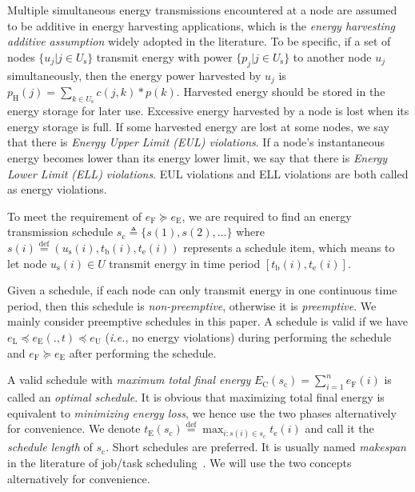 \documentclass[journal,10pt]{IEEEtran}
\begin{document}
Multiple simultaneous energy transmissions encountered at a node are assumed to be additive in energy harvesting applications, which is the \textit{energy harvesting additive assumption} widely adopted in the literature\cite{He2013,Dai2017TON,Dai2018TON}. To be specific, if a set of nodes $\{u_j|j{\in}U_\text{s}\}$ transmit energy with power $\{p_j|j{\in}U_\text{s}\}$ to another node $u_j$ simultaneously, then the energy power harvested by $u_j$ is $p_\text{H}(j){=}\sum_{k{\in}U_\text{s}}c(j,k){*}p(k)$. Harvested energy should be stored in the energy storage for later use. Excessive energy harvested by a node is lost when its energy storage is full. If some harvested energy are lost at some nodes, we say that there is \textit{Energy Upper Limit (EUL) violations}. If a node's instantaneous energy becomes lower than its energy lower limit, we say that there is \textit{Energy Lower Limit (ELL) violations}. EUL violations and ELL violations are both called as energy violations.

To meet the requirement of $e_\text{F}{\succeq}e_\text{E}$, we are required to find an energy transmission schedule $s_\text{c}{\triangleq}\{s(1),s(2),\ldots\}$ where $s(i){\mathop{=}\limits^\text{def}}(u_\text{s}(i), t_\text{b}(i),t_\text{e}(i))$ represents a schedule item, which means to let node $u_\text{s}(i){\in}U$ transmit energy in time period $[t_\text{b}(i),t_\text{e}(i)]$.

Given a schedule, if each node can only transmit energy in one continuous time period, then this schedule is \textit{non-preemptive}, otherwise it is \textit{preemptive}. We mainly consider preemptive schedules in this paper. A schedule is valid if we have $e_\text{L}{\preceq}e_\text{E}(.,t){\preceq}e_\text{U}$ (\textit{i.e.}, no energy violations) during performing the schedule and $e_\text{F}{\succeq}e_\text{E}$ after performing the schedule.

A valid schedule with \textit{maximum total final energy} $E_\text{C}(s_\text{c}){=}\sum_{i{=}1}^{n}e_\text{F}(i)$ is called an \textit{optimal schedule}. It is obvious that maximizing total final energy is equivalent to \textit{minimizing energy loss}, we hence use the two phases alternatively for convenience. We denote $t_\text{E}(s_\text{c}){\mathop{=}\limits^\text{def}}\max_{i{:}s(i){\in}s_\text{c}}t_\text{e}(i)$ and call it the \textit{schedule length} of $s_\text{c}$. Short schedules are preferred. It is usually named \textit{makespan} in the literature of job/task scheduling~\cite{Marx2004}. We will use the two concepts alternatively for convenience.
\end{document}
